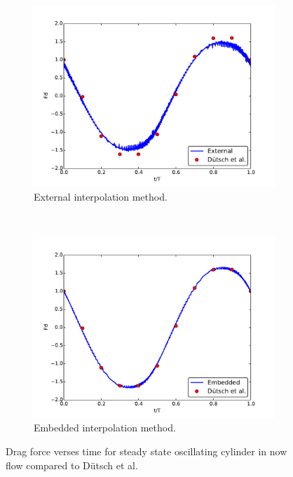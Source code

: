 \begin{figure}[!htb]
	\centering
	\par\medskip
	\begin{subfigure}{0.4\textwidth}
		\includegraphics[width=\linewidth]{staticexss}
		\caption{External interpolation method.}
	\end{subfigure}
	~
	\begin{subfigure}{0.4\textwidth}
		\includegraphics[width=\linewidth]{staticemss}
		\caption{Embedded interpolation method.}
	\end{subfigure}
	\caption{Drag force verses time for steady state oscillating cylinder in now flow compared to D\"{u}tsch et al.~\cite{dutsch1998low}}
	\label{fig:static2}
\end{figure}

